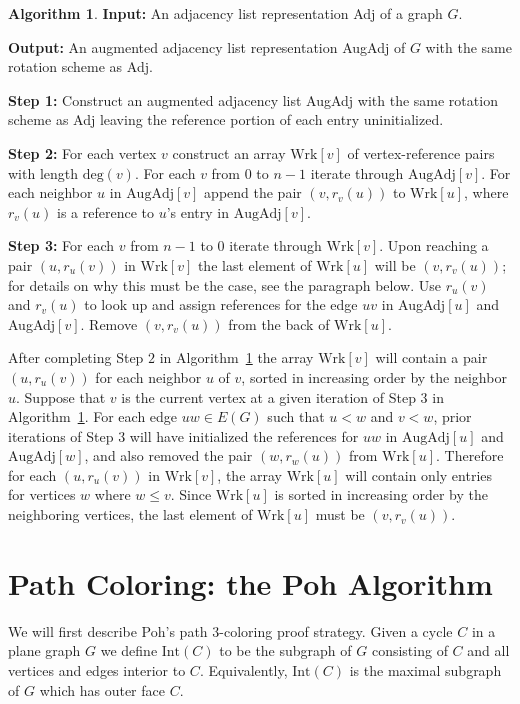 \documentclass[12pt,letterpaper]{article}
\theoremstyle{plain}
\theoremstyle{definition}
\theoremstyle{break}
\newtheorem{algorithm}[lemma]{Algorithm}     %
\begin{document}
\begin{algorithm}\label{A:augment}
\textbf{Input:} An adjacency list representation Adj of a graph $G$.

\textbf{Output:} An augmented adjacency list representation AugAdj of
$G$ with the same rotation scheme as Adj.

\textbf{Step 1:} Construct an augmented adjacency list AugAdj with
the same rotation scheme as Adj leaving the reference portion of each entry
uninitialized.

\textbf{Step 2:} For each vertex $v$ construct an array $\text{Wrk}[v]$
of vertex-reference pairs with length $\text{deg}(v)$. For each $v$ from
$0$ to $n-1$ iterate through
$\text{AugAdj}[v]$. For each neighbor $u$ in $\text{AugAdj}[v]$ append the pair
$(v,r_v(u))$ to
$\text{Wrk}[u]$, where $r_v(u)$ is a reference to $u$'s entry in
$\text{AugAdj}[v]$.

\textbf{Step 3:} For each $v$ from $n-1$ to $0$ iterate through
$\text{Wrk}[v]$. Upon reaching a pair $(u,r_u(v))$ in $\text{Wrk}[v]$ the
last element of $\text{Wrk}[u]$ will be $(v,r_v(u))$; for details on why this
must be the case, see the paragraph below. Use
$r_u(v)$ and $r_v(u)$ to look up and assign references for the edge $uv$ in
AugAdj$[u]$ and AugAdj$[v]$. Remove $(v,r_v(u))$ from the back of
$\text{Wrk}[u]$.
\end{algorithm}

After completing Step $2$ in Algorithm~\ref{A:augment} the array $\text{Wrk}[v]$
will contain
a pair $(u,r_u(v))$ for each neighbor $u$ of $v$, sorted in increasing order by
the neighbor $u$.
Suppose that $v$ is the current vertex at a given iteration of Step $3$ in
Algorithm~\ref{A:augment}. For each edge $uw\in E(G)$ such that
$u<w$ and $v<w$, prior iterations of Step 3 will have initialized the
references for $uw$ in $\text{AugAdj}[u]$ and $\text{AugAdj}[w]$, and also
removed the pair
$(w,r_w(u))$ from $\text{Wrk}[u]$. Therefore for each $(u,r_u(v))$ in
$\text{Wrk}[v]$, the array $\text{Wrk}[u]$ will contain only entries for
vertices $w$ where $w\le v$. Since $\text{Wrk}[u]$ is sorted in
increasing order by the neighboring vertices, the last element of
$\text{Wrk}[u]$ must be $(v,r_v(u))$.

\section{Path Coloring: the Poh Algorithm}

We will first describe Poh's path $3$-coloring proof strategy.
Given a cycle $C$ in a plane graph $G$ we define $\text{Int}(C)$ to
be the subgraph of $G$ consisting of $C$ and all vertices and edges interior to
$C$. Equivalently, $\text{Int}(C)$ is the maximal subgraph of $G$ which has
outer face $C$.
\end{document}
